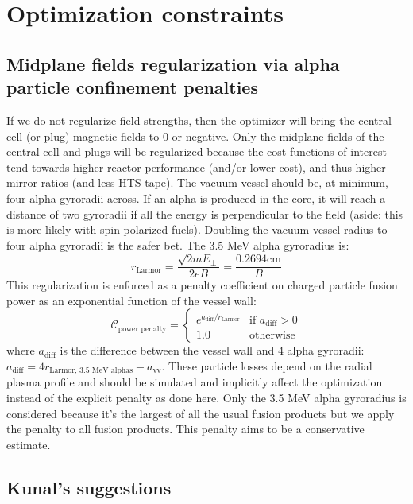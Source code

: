 \section{Optimization constraints}

\subsection{Midplane fields regularization via alpha particle confinement penalties}
If we do not regularize field strengths, then the optimizer will bring the central cell (or plug) magnetic fields to 0 or negative. Only the midplane fields of the central cell and plugs will be regularized because the cost functions of interest tend towards higher reactor performance (and/or lower cost), and thus higher mirror ratios (and less HTS tape).
The vacuum vessel should be, at minimum, four alpha gyroradii across. If an alpha is produced in the core, it will reach a distance of two gyroradii if all the energy is perpendicular to the field (aside: this is more likely with spin-polarized fuels). Doubling the vacuum vessel radius to four alpha gyroradii is the safer bet.
The 3.5 MeV alpha gyroradius is:
\begin{equation}
    r_\text{Larmor} = \frac{\sqrt{2 m E_\perp}}{2eB} = \frac{0.2694 \text{cm}}{B}
\end{equation}
This regularization is enforced as a penalty coefficient on charged particle fusion power as an exponential function of the vessel wall:
\begin{equation}
    \mathcal{C}_\text{power penalty} =
    \begin{cases}
        e^{{a_\text{diff} / r_\text{Larmor}}} & \text{if } a_\text{diff} > 0 \\ 
        1.0 & \text{otherwise}
    \end{cases}
\end{equation}
where $a_\text{diff}$ is the difference between the vessel wall and 4 alpha gyroradii: $a_\text{diff} = 4 r_\text{Larmor, 3.5 MeV alphas} - a_\text{vv}$. 
These particle losses depend on the radial plasma profile and should be simulated and implicitly affect the optimization instead of the explicit penalty as done here. Only the 3.5 MeV alpha gyroradius is considered because it's the largest of all the usual fusion products but we apply the penalty to all fusion products. This penalty aims to be a conservative estimate.

\subsection{Kunal's suggestions}

